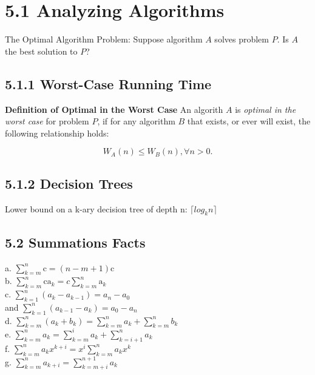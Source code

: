 \documentclass[10pt,twocolumn]{article}
\begin{document}
	\section*{5.1 Analyzing Algorithms}
	
	The Optimal Algorithm Problem: Suppose algorithm $A$ solves
        problem $P$. Is $A$ the best solution to $P$?
	
	\subsection*{5.1.1 Worst-Case Running Time}
	
	\textbf{Definition of Optimal in the Worst Case} An algorith
        $A$ is \emph{optimal in the worst case} for problem $P$, if
        for any algorithm $B$ that exists, or ever will exist, the
        following relationship holds:
	
	\[W_A(n)\leq W_B(n),\forall n>0.\]
	
	\subsection*{5.1.2 Decision Trees}
	
	Lower bound on a k-ary decision tree of depth n: $\lceil log_k n\rceil$
	
	\subsection*{5.2 Summations Facts}
	a. $\displaystyle \sum_{k=m}^n \mathrm{c} = (n - m + 1)\mathrm{c}$ \\
	b. $\displaystyle \sum_{k=m}^n \mathrm{c a_\mathit{k}} = c
	\displaystyle\sum_{k=m}^n \mathrm{a_\mathit{k}}$\\
	c. $\displaystyle\sum_{k=1}^n (a_\mathit{k} - a_\mathit{k - 1}) =
	a_\mathit{n} - a_\mathit{0}$ \\
		and $ \displaystyle\sum_{k=1}^n
	(a_\mathit{k - 1} - a_\mathit{k}) = a_\mathit{0} - a_\mathit{n}$\\
	d. $\displaystyle\sum_{k=m}^n (a_\mathit{k} + b_\mathit{k}) =
	\displaystyle\sum_{k=m}^n a_\mathit{k} + \displaystyle\sum_{k=m}^n
	b_\mathit{k}$\\
	e. $\displaystyle\sum_{k=m}^n a_\mathit{k} = \displaystyle\sum_{k=m}^i
	a_\mathit{k} +  \displaystyle\sum_{k=i+1}^n a_\mathit{k}$\\
	f. $\displaystyle\sum_{k=m}^n a_\mathit{k}x^\mathit{k+i} = 
	x^\mathit{i} \sum_{k=m}^n a_\mathit{k}x^\mathit{k}$\\
	g. $\displaystyle\sum_{k=m}^n a_\mathit{k+i} = \displaystyle\sum_{k=m+i}^{n+1}
	a_\mathit{k}$\\
\end{document}
